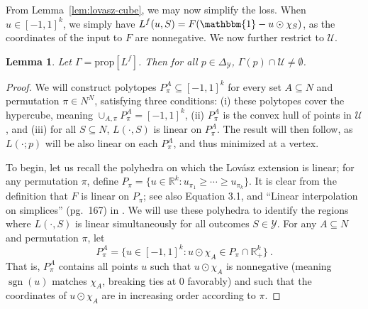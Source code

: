 \documentclass[11pt]{article}
\newcommand{\reals}{\mathbb{R}}
\newcommand{\prop}[1]{\mathrm{prop}[#1]}
\newcommand{\simplex}{\Delta_\Y}
\newcommand{\U}{\mathcal{U}}
\newcommand{\Y}{\mathcal{Y}}
\newcommand{\ones}{\mathbbm{1}}
\DeclareMathOperator*{\sgn}{sgn}
\newtheorem{lemma}{Lemma}
\begin{document}
From Lemma~\ref{lem:lovasz-cube}, we may now simplify the loss.
When $u\in[-1,1]^k$, we simply have $L^f(u,S) = F(\ones - u \odot \chi_S)$, as the coordinates of the input to $F$ are nonnegative.
We now further restrict to $\U$.

\begin{lemma}
	\label{lem:lovasz-trim}
	Let $\Gamma = \prop{L^f}$.
	Then for all $p\in\simplex$, $\Gamma(p) \cap \U \neq \emptyset$.
\end{lemma}
\begin{proof}
	We will construct polytopes $P^A_\pi \subseteq [-1,1]^k$ for every set $A\subseteq N$ and permutation $\pi \in N^N$, satisfying three conditions: (i) these polytopes cover the hypercube, meaning $\cup_{A,\pi} P^A_\pi = [-1,1]^k$, (ii) $P^A_\pi$ is the convex hull of points in $\U$, and (iii) for all $S\subseteq N$, $L(\cdot,S)$ is linear on $P^A_\pi$.
	The result will then follow, as $L(\cdot;p)$ will be also linear on each $P^A_\pi$, and thus minimized at a vertex.
	
	To begin, let us recall the polyhedra on which the Lov\'asz extension is linear; for any permutation $\pi$, define $P_\pi = \{u\in\reals^k : u_{\pi_1} \geq \cdots \geq u_{\pi_k}\}$.
	It is clear from the definition that $F$ is linear on $P_\pi$; see also Equation 3.1, and ``Linear interpolation on simplices'' (pg.\ 167) in \citet{bach2013learning}.
	We will use these polyhedra to identify the regions where $L(\cdot,S)$ is linear simultaneously for all outcomes $S\in\Y$.
	For any $A\subseteq N$ and permutation $\pi$, let
	\begin{equation}
	\label{eq:poly-pi}
	P^A_\pi = \{u\in[-1,1]^k : u \odot \chi_A \in P_\pi \cap \reals^k_+\}~.
	\end{equation}
	That is, $P^A_\pi$ contains all points $u$ such that $u \odot \chi_A$ is nonnegative (meaning $\sgn(u)$ matches $\chi_A$, breaking ties at $0$ favorably) and such that the coordinates of $u \odot \chi_A$ are in increasing order according to $\pi$.
	

\end{proof}
\end{document}
